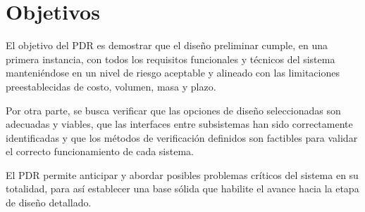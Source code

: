 \chapter{Objetivos}
El objetivo del PDR es demostrar que el diseño preliminar cumple, en una primera instancia,
con todos los requisitos funcionales y técnicos del sistema manteniéndose en un nivel
de riesgo aceptable y alineado con las limitaciones preestablecidas de costo, volumen, masa
y plazo.

Por otra parte, se busca verificar que las opciones de diseño seleccionadas son adecuadas
y viables, que las interfaces entre subsistemas han sido correctamente identificadas y que
los métodos de verificación definidos son factibles para validar el correcto funcionamiento de
cada sistema.

El PDR permite anticipar y abordar posibles problemas críticos del sistema en su totalidad, para así
establecer una base sólida que habilite el avance hacia la etapa de diseño detallado.
